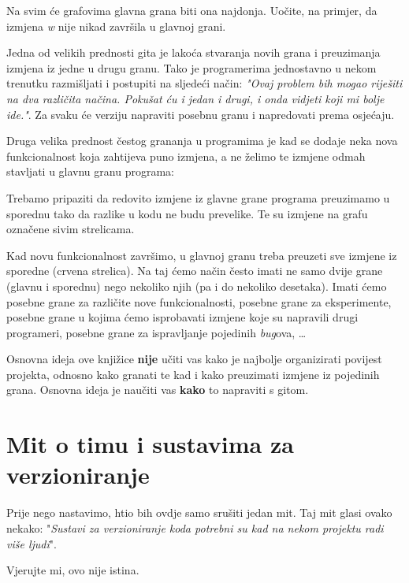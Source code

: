

Na svim će grafovima glavna grana biti ona najdonja.
Uočite, na primjer, da izmjena \emph w nije nikad završila u glavnoj grani. 

Jedna od velikih prednosti gita je lakoća stvaranja novih grana i preuzimanja izmjena iz jedne u drugu granu. 
Tako je programerima jednostavno u nekom trenutku razmišljati i postupiti na sljedeći način: \emph{"Ovaj problem bih mogao riješiti na dva različita načina. Pokušat ću i jedan i drugi, i onda vidjeti koji mi bolje ide."}. Za svaku će verziju napraviti posebnu granu i napredovati prema osjećaju.

Druga velika prednost čestog grananja u programima je kad se dodaje neka nova funkcionalnost koja zahtijeva puno izmjena, a ne želimo te izmjene odmah stavljati u glavnu granu programa:



Trebamo pripaziti da redovito izmjene iz glavne grane programa preuzimamo u sporednu tako da razlike u kodu ne budu prevelike. 
Te su izmjene na grafu označene sivim strelicama.

Kad novu funkcionalnost završimo, u glavnoj granu treba preuzeti sve izmjene iz sporedne (crvena strelica). Na taj ćemo način često imati ne samo dvije grane (glavnu i sporednu) nego nekoliko njih (pa i do nekoliko desetaka). 
Imati ćemo posebne grane za različite nove funkcionalnosti, posebne grane za eksperimente, posebne grane u kojima ćemo isprobavati izmjene koje su napravili drugi programeri, posebne grane za ispravljanje pojedinih \emph{bug}ova, \dots

Osnovna ideja ove knjižice \textbf{nije} učiti vas kako je najbolje organizirati povijest projekta, odnosno kako granati te kad i kako preuzimati izmjene iz pojedinih grana.
Osnovna ideja je naučiti vas \textbf{kako} to napraviti s gitom. 

\section*{Mit o timu i sustavima za verzioniranje}

Prije nego nastavimo, htio bih ovdje samo srušiti jedan mit. 
Taj mit glasi ovako nekako: "\emph{Sustavi za verzioniranje koda potrebni su kad na nekom projektu radi više ljudi}".

Vjerujte mi, ovo nije istina.

